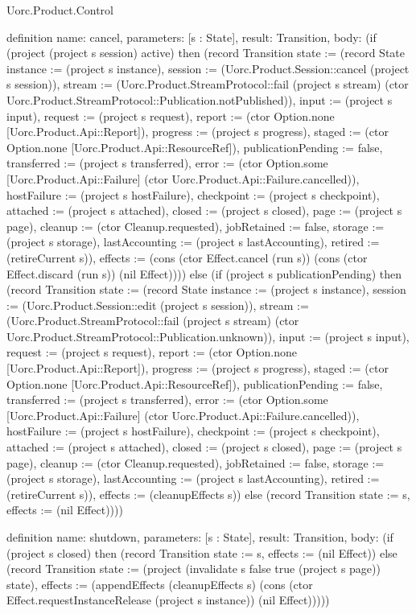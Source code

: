 \begin{lexlean}{Uorc.Product.Control}
\begin{semanticmodule}
definition{
  name: cancel,
  parameters: [s : State],
  result: Transition,
  body: (if (project (project s session) active) then (record Transition {state := (record State {instance := (project s instance), session := (Uorc.Product.Session::cancel (project s session)), stream := (Uorc.Product.StreamProtocol::fail (project s stream) (ctor Uorc.Product.StreamProtocol::Publication.notPublished)), input := (project s input), request := (project s request), report := (ctor Option.none [Uorc.Product.Api::Report]), progress := (project s progress), staged := (ctor Option.none [Uorc.Product.Api::ResourceRef]), publicationPending := false, transferred := (project s transferred), error := (ctor Option.some [Uorc.Product.Api::Failure] (ctor Uorc.Product.Api::Failure.cancelled)), hostFailure := (project s hostFailure), checkpoint := (project s checkpoint), attached := (project s attached), closed := (project s closed), page := (project s page), cleanup := (ctor Cleanup.requested), jobRetained := false, storage := (project s storage), lastAccounting := (project s lastAccounting), retired := (retireCurrent s)}), effects := (cons (ctor Effect.cancel (run s)) (cons (ctor Effect.discard (run s)) (nil Effect)))}) else (if (project s publicationPending) then (record Transition {state := (record State {instance := (project s instance), session := (Uorc.Product.Session::edit (project s session)), stream := (Uorc.Product.StreamProtocol::fail (project s stream) (ctor Uorc.Product.StreamProtocol::Publication.unknown)), input := (project s input), request := (project s request), report := (ctor Option.none [Uorc.Product.Api::Report]), progress := (project s progress), staged := (ctor Option.none [Uorc.Product.Api::ResourceRef]), publicationPending := false, transferred := (project s transferred), error := (ctor Option.some [Uorc.Product.Api::Failure] (ctor Uorc.Product.Api::Failure.cancelled)), hostFailure := (project s hostFailure), checkpoint := (project s checkpoint), attached := (project s attached), closed := (project s closed), page := (project s page), cleanup := (ctor Cleanup.requested), jobRetained := false, storage := (project s storage), lastAccounting := (project s lastAccounting), retired := (retireCurrent s)}), effects := (cleanupEffects s)}) else (record Transition {state := s, effects := (nil Effect)})))
}

definition{
  name: shutdown,
  parameters: [s : State],
  result: Transition,
  body: (if (project s closed) then (record Transition {state := s, effects := (nil Effect)}) else (record Transition {state := (project (invalidate s false true (project s page)) state), effects := (appendEffects (cleanupEffects s) (cons (ctor Effect.requestInstanceRelease (project s instance)) (nil Effect)))}))
}


\end{semanticmodule}
\end{lexlean}
